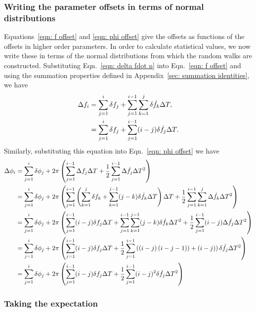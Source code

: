 \subsubsection{Writing the parameter offsets in terms of normal distributions}
Equations~\eqref{eqn: f offset} and \eqref{eqn: phi
offset} give the offsets as functions of the offsets in higher order
parameters. In order to calculate statistical values, we now write these in terms of
the normal distributions from which the random walks are constructed.
Substituting Eqn.~\eqref{eqn: delta fdot n} into Eqn.~\eqref{eqn: f offset} and using the summation properties defined
in Appendix~\ref{sec: summation identities}, we have
\begin{align}
\Delta f_{i}  & = \sum_{j=1}^{i}\delta f_{j}
+ \sum_{j=1}^{i-1}\sum_{k=1}^{j}\delta \dot{f}_{k} \Delta T ,  \\
& = \sum_{j=1}^{i}\delta f_{j}
+ \sum_{j=1}^{i-1}(i-j)\delta \dot{f}_{j} \Delta T .
\label{eqn: delta f n}
\end{align}
Similarly, substituting this equation into Eqn.~\eqref{eqn: phi offset} we
have
\begin{align}
\begin{split}
\Delta\phi_{i} & = \sum_{j=1}^{i}\delta \phi_{j}
+ 2\pi \left(\sum_{j=1}^{i-1}\Delta f_{j}\Delta T
+ \frac{1}{2}\sum_{j=1}^{i-1}\Delta\dot{f}_{j}\Delta T^{2}\right) \\
& = \sum_{j=1}^{i}\delta \phi_{j} + 2\pi\left(\sum_{j=1}^{i-1}\left(\sum_{k=1}^{j}\delta f_{k}
+ \sum_{k=1}^{j-1}(j-k)\delta\dot{f}_{k}\Delta T\right)\Delta T
 + \frac{1}{2}\sum_{j=1}^{i-1}\sum_{k=1}^{j}\Delta\dot{f}_{k}\Delta T^{2} \right)  \\
& = \sum_{j=1}^{i}\delta \phi_{j} + 2\pi\left(\sum_{j=1}^{i-1}(i-j)\delta f_{j}\Delta T
 + \sum_{j=1}^{i-1}\sum_{k=1}^{j-1}(j-k)\delta\dot{f}_{k}\Delta T^{2}
 + \frac{1}{2}\sum_{j=1}^{i-1}(i-j)\Delta\dot{f}_{j}\Delta T^{2} \right)  \\
& = \sum_{j=1}^{i}\delta \phi_{j} + 2\pi\left(\sum_{j=1}^{i-1}(i-j)\delta f_{j}\Delta T
 + \frac{1}{2}\sum_{j=1}^{i-1}\left(\left(i-j\right)\left(i-j-1)\right)
 + (i-j)\right)\delta\dot{f}_{j}\Delta T^{2}\right)  \\
& = \sum_{j=1}^{i}\delta \phi_{j} + 2\pi\left(\sum_{j=1}^{i-1}(i-j)\delta f_{j}\Delta T
 + \frac{1}{2}\sum_{j=1}^{i-1}(i-j)^{2}\delta\dot{f}_{j}\Delta T^{2}\right)
\end{split}
\label{eqn: delta phi n}
\end{align}

\subsubsection{Taking the expectation}

